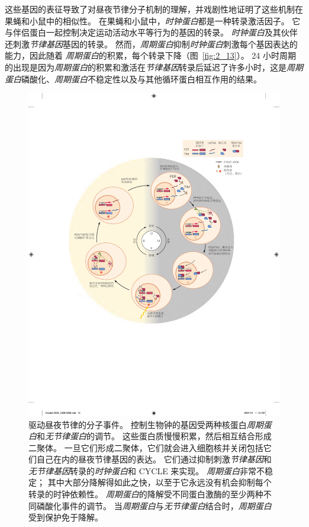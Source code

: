这些基因的表征导致了对昼夜节律分子机制的理解，并戏剧性地证明了这些机制在果蝇和小鼠中的相似性。
在果蝇和小鼠中，\textit{时钟蛋白}都是一种转录激活因子。 
它与伴侣蛋白一起控制决定运动活动水平等行为的基因的转录。
\textit{时钟蛋白}及其伙伴还刺激\textit{节律基因}基因的转录。
然而，\textit{周期蛋白}抑制\textit{时钟蛋白}刺激每个基因表达的能力，因此随着 \textit{周期蛋白}的积累，每个转录下降（图~\ref{fig:2_13}）。
24 小时周期的出现是因为\textit{周期蛋白}的积累和激活在\textit{节律基因}转录后延迟了许多小时，这是\textit{周期蛋白}磷酸化、\textit{周期蛋白}不稳定性以及与其他循环蛋白相互作用的结果。


\begin{figure}[htbp]
	\centering
	\includegraphics[width=0.8\linewidth]{chap02/fig_2_13}
	\caption{驱动昼夜节律的分子事件。
		控制生物钟的基因受两种核蛋白\textit{周期蛋白}和\textit{无节律蛋白}的调节。
		这些蛋白质慢慢积累，然后相互结合形成二聚体。
		一旦它们形成二聚体，它们就会进入细胞核并关闭包括它们自己在内的昼夜节律基因的表达。
		它们通过抑制刺激\textit{节律基因}和\textit{无节律基因}转录的\textit{时钟蛋白}和 CYCLE 来实现。
		\textit{周期蛋白}非常不稳定；
		其中大部分降解得如此之快，以至于它永远没有机会抑制每个转录的时钟依赖性。 
		\textit{周期蛋白}的降解受不同蛋白激酶的至少两种不同磷酸化事件的调节。
		当\textit{周期蛋白}与\textit{无节律蛋白}结合时，\textit{周期蛋白}受到保护免于降解。 
}
\end{figure}
